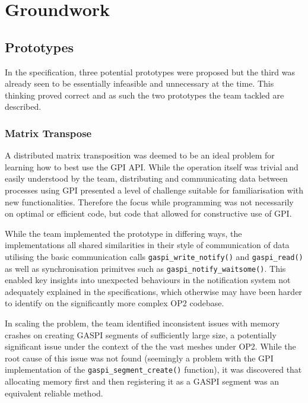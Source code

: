 \chapter{Groundwork}


\section{Prototypes}
In the specification, three potential prototypes were proposed but the third was already seen to be essentially infeasible and unnecessary at the time. This thinking proved correct and as such the two prototypes the team tackled are described.

\subsection{Matrix Transpose}
A distributed matrix transposition was deemed to be an ideal problem for learning how to best use the GPI API. While the operation itself was trivial and easily understood by the team, distributing and communicating data between processes using GPI presented a level of challenge suitable for familiarisation with new functionalities. Therefore the focus while programming was not necessarily on optimal or efficient code, but code that allowed for constructive use of GPI.

While the team implemented the prototype in differing ways, the implementations all shared similarities in their style of communication of data utilising the basic communication calls \texttt{gaspi\_write\_notify()} and \texttt{gaspi\_read()} as well as synchronisation primitves such as \texttt{gaspi\_notify\_waitsome()}. This enabled key insights into unexpected behaviours in the notification system not adequately explained in the specifications, which otherwise may have been harder to identify on the significantly more complex OP2 codebase.

In scaling the problem, the team identified inconsistent issues with memory crashes on creating GASPI segments of sufficiently large size, a potentially significant issue under the context of the the vast meshes under OP2. While the root cause of this issue was not found (seemingly a problem with the GPI implementation of the \texttt{gaspi\_segment\_create()} function), it was discovered that allocating memory first and then registering it as a GASPI segment was an equivalent reliable method.

